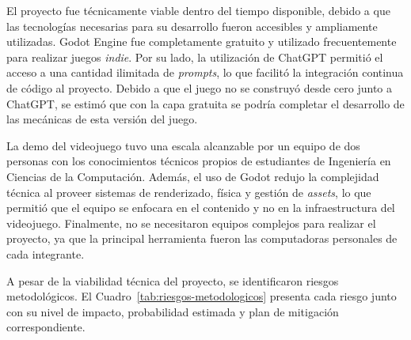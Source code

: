El proyecto fue técnicamente viable dentro del tiempo disponible, debido a que las tecnologías necesarias para su desarrollo fueron accesibles y ampliamente utilizadas. Godot Engine fue completamente gratuito y utilizado frecuentemente para realizar juegos \textit{indie}. Por su lado, la utilización de ChatGPT permitió el acceso a una cantidad ilimitada de \textit{prompts}, lo que facilitó la integración continua de código al proyecto. Debido a que el juego no se construyó desde cero junto a ChatGPT, se estimó que con la capa gratuita se podría completar el desarrollo de las mecánicas de esta versión del juego.

La demo del videojuego tuvo una escala alcanzable por un equipo de dos personas con los conocimientos técnicos propios de estudiantes de Ingeniería en Ciencias de la Computación. Además, el uso de Godot redujo la complejidad técnica al proveer sistemas de renderizado, física y gestión de \textit{assets}, lo que permitió que el equipo se enfocara en el contenido y no en la infraestructura del videojuego. Finalmente, no se necesitaron equipos complejos para realizar el proyecto, ya que la principal herramienta fueron las computadoras personales de cada integrante.

A pesar de la viabilidad técnica del proyecto, se identificaron riesgos metodológicos. El Cuadro~\ref{tab:riesgos-metodologicos} presenta cada riesgo junto con su nivel de impacto, probabilidad estimada y plan de mitigación correspondiente.

